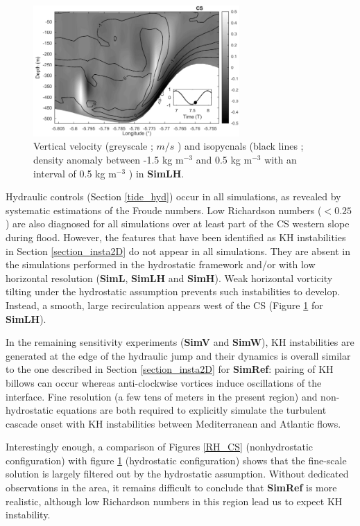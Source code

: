 \begin{figure}[!h]
\centering
  \includegraphics[width=0.7\textwidth]{./GBR2D/figure11.png}
  \caption [Vertical velocity and isopycnals]{Vertical velocity (greyscale ; $m/s$ ) and isopycnals (black lines ; density anomaly between -1.5 kg m$^{-3}$ and 0.5 kg m$^{-3}$ with an interval of 0.5 kg m$^{-3}$ ) in \textbf{SimLH}.}
	\label{fig_sensnum1}
\end{figure}

Hydraulic controls (Section \ref{tide_hyd}) occur in all simulations, as revealed by systematic estimations of the Froude numbers. Low Richardson numbers ($<0.25$) are also diagnosed for all simulations over at least part of the CS western slope during flood. However, the features that have been identified as KH instabilities in Section \ref{section_insta2D} do not appear in all simulations. They are absent in the simulations performed in the hydrostatic framework and/or with low horizontal resolution (\textbf{SimL}, \textbf{SimLH} and \textbf{SimH}). Weak horizontal vorticity tilting under the hydrostatic assumption prevents such instabilities to develop. Instead, a smooth, large recirculation  appears west of the CS (Figure \ref{fig_sensnum1} for \textbf{SimLH}).

In the remaining sensitivity experiments (\textbf{SimV} and \textbf{SimW}), KH instabilities are generated at the edge of the hydraulic jump and their dynamics is overall similar to the one described in Section \ref{section_insta2D} for \textbf{SimRef}: pairing of KH billows can occur whereas anti-clockwise vortices induce oscillations of the interface. 
Fine resolution (a few tens of meters in the present region) and non-hydrostatic equations are both required to explicitly simulate the turbulent cascade onset with KH instabilities between Mediterranean and Atlantic flows. 

Interestingly enough, a comparison of Figures \ref{RH_CS} (nonhydrostatic configuration) with figure \ref{fig_sensnum1} (hydrostatic configuration) shows that the fine-scale solution is largely filtered out by the hydrostatic assumption. Without dedicated observations in the area, it remains difficult to conclude that \textbf{SimRef} is more realistic, although low Richardson numbers in this region lead us to expect KH instability.

